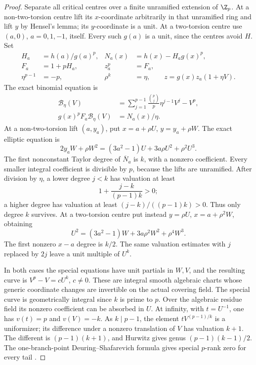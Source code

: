 \begin{proof}
Separate all critical centres over a finite
unramified extension of \(\Z_p\). At a non-two-torsion
centre lift its \(x\)-coordinate arbitrarily in that
unramified ring and lift \(y\) by Hensel's lemma;
its \(y\)-coordinate is a unit. At a two-torsion
centre use \((a,0)\), \(a=0,1,-1\), itself.
Every such \(g(a)\) is a unit, since the centres
avoid \(H\). Set
\[
 \begin{aligned}
 H_a&=h(a)/g(a)^p,&
 N_a(x)&=h(x)-H_a g(x)^p,\\
 F_a&=1+pH_a,& z_a^p&=F_a,\\
 \eta^{p-1}&=-p,& \rho^k&=\eta,
                \qquad z=g(x)z_a(1+\eta V).
 \end{aligned}                                         \tag{A.62.12}
\]
The exact binomial equation is
\[
 \begin{aligned}
 \mathcal B_\eta(V)
   &=\sum_{j=1}^{p-1}\frac{\binom pj}{p}\eta^{j-1}V^j-V^p,\\
 g(x)^pF_a\mathcal B_\eta(V)&=N_a(x)/\eta.
 \end{aligned}                                         \tag{A.62.13}
\]
At a non-two-torsion lift \((a,y_a)\), put
\(x=a+\rho U\), \(y=y_a+\rho W\). The exact
elliptic equation is
\[
 2y_aW+\rho W^2
          =(3a^2-1)U+3a\rho U^2+\rho^2U^3.
                                                        \tag{A.62.14}
\]
The first nonconstant Taylor degree of
\(\overline N_a\) is \(k\), with a nonzero
coefficient. Every smaller integral coefficient
is divisible by \(p\), because the lifts are
unramified. After division by \(\eta\), a lower
degree \(j<k\) has valuation at least
\[
                 1+\frac{j-k}{(p-1)k}>0;
                                                        \tag{A.62.15}
\]
a higher degree has valuation at least
\((j-k)/((p-1)k)>0\). Thus only degree \(k\)
survives. At a two-torsion centre put instead
\(y=\rho U\), \(x=a+\rho^2W\), obtaining
\[
 U^2=(3a^2-1)W+3a\rho^2W^2+\rho^4W^3.
                                                        \tag{A.62.16}
\]
The first nonzero \(x-a\) degree is \(k/2\).
The same valuation estimates with \(j\) replaced
by \(2j\) leave a unit multiple of \(U^k\).

In both cases the special equations have unit
partials in \(W,V\), and the resulting curve is
\(V^p-V=cU^k\), \(c\ne0\). These are integral
smooth algebraic charts whose generic coordinate
changes are invertible on the actual covering field.
The special curve is geometrically integral since
\(k\) is prime to \(p\). Over the algebraic residue
field its nonzero coefficient can be absorbed in \(U\).
At infinity, with \(t=U^{-1}\), one has
\(v(t)=p\) and \(v(V)=-k\). As \(k\mid p-1\),
the element \(tV^{(p-1)/k}\) is a uniformizer;
its difference under a nonzero translation of \(V\)
has valuation \(k+1\). The different is
\((p-1)(k+1)\), and Hurwitz gives genus
\((p-1)(k-1)/2\). The one-branch-point
Deuring--Shafarevich formula gives special \(p\)-rank
zero for every tail \cite[Corollary 1.8]{fghCrew1984}.


\end{proof}
